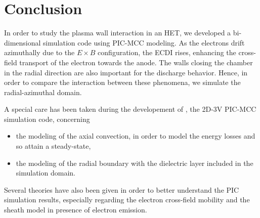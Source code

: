 


\section{Conclusion}
  \label{sec-conclusion_ch1}
  

  In order to study the plasma wall interaction in an \ac{HET}, we developed a bi-dimensional simulation code using \ac{PIC}-\ac{MCC} modeling.
  As the electrons drift azimuthally due to the $E \times B$ configuration, the \ac{ECDI} rises, enhancing the cross-field transport of the electron towards the anode.
  The walls closing the chamber in the radial direction are also important for the discharge behavior.
  Hence, in order to compare the interaction between these phenomena, we simulate the radial-azimuthal domain.
  
  A special care has been taken during the developement of \LPPic, the \ac{2D}-\ac{3V} \ac{PIC}-\ac{MCC} simulation code, concerning
  \begin{itemize}
    \item the modeling of the axial convection, in order to model the energy losses and so attain a steady-state,
    \item the modeling of the radial boundary with the dielectric layer included in the simulation domain.
  \end{itemize}
  
  Several theories have also been given in order to better understand the \ac{PIC} simulation results, especially regarding the electron cross-field mobility and the sheath model in presence of electron emission.